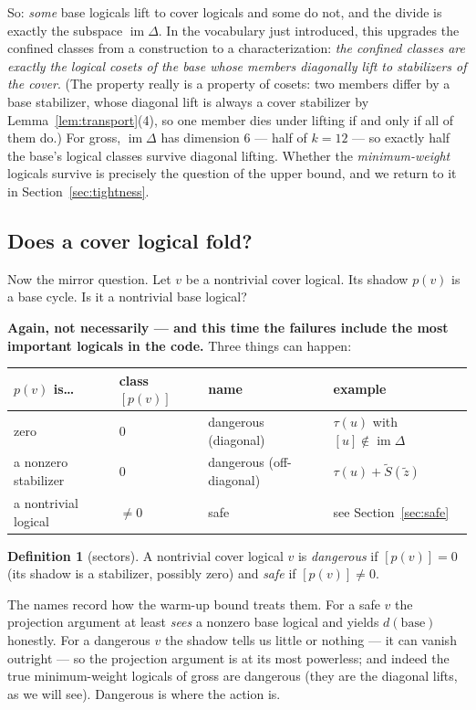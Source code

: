 \documentclass[11pt]{article}
\theoremstyle{plain}
\theoremstyle{definition}
\newtheorem{definition}[theorem]{Definition}
\theoremstyle{remark}
\newcommand{\imD}{\operatorname{im}\Delta}
\newcommand{\base}{\mathrm{base}}
\begin{document}
So: \emph{some} base logicals lift to cover logicals and some do not, and the
divide is exactly the subspace $\imD$. In the vocabulary just introduced,
this upgrades the confined classes from a construction to a
characterization: \emph{the confined classes are exactly the logical cosets
of the base whose members diagonally lift to stabilizers of the cover}. (The
property really is a property of cosets: two members differ by a base
stabilizer, whose diagonal lift is always a cover stabilizer by
Lemma~\ref{lem:transport}(4), so one member dies under lifting if and only
if all of them do.) For gross, $\imD$ has dimension $6$ --- half of
$k = 12$ --- so exactly half the base's logical classes survive diagonal
lifting. Whether the \emph{minimum-weight} logicals survive is
precisely the question of the upper bound, and we return to it in
Section~\ref{sec:tightness}.

\subsection{Does a cover logical fold?}
\label{sec:fold}

Now the mirror question. Let $v$ be a nontrivial cover logical. Its shadow
$p(v)$ is a base cycle. Is it a nontrivial base logical?

\textbf{Again, not necessarily --- and this time the failures include the most
important logicals in the code.} Three things can happen:

\begin{center}
\begin{tabular}{llll}
\toprule
$p(v)$ is\dots & class $[p(v)]$ & name & example\\
\midrule
zero & $0$ & dangerous (diagonal) & $\tau(u)$ with $[u]\notin\imD$\\
a nonzero stabilizer & $0$ & dangerous (off-diagonal) & $\tau(u) + \widetilde S(\widetilde z)$\\
a nontrivial logical & $\neq 0$ & safe & see Section~\ref{sec:safe}\\
\bottomrule
\end{tabular}
\end{center}

\begin{definition}[sectors]\label{def:sectors}
A nontrivial cover logical $v$ is \emph{dangerous} if $[p(v)] = 0$ (its shadow
is a stabilizer, possibly zero) and \emph{safe} if $[p(v)] \neq 0$.
\end{definition}

The names record how the warm-up bound treats them. For a safe $v$ the
projection argument at least \emph{sees} a nonzero base logical and yields
$d(\base)$ honestly. For a dangerous $v$ the shadow tells us little or nothing
--- it can vanish outright --- so the projection argument is at its most
powerless; and indeed the true minimum-weight logicals of gross are dangerous
(they are the diagonal lifts, as we will see). Dangerous is where the action
is.
\end{document}
